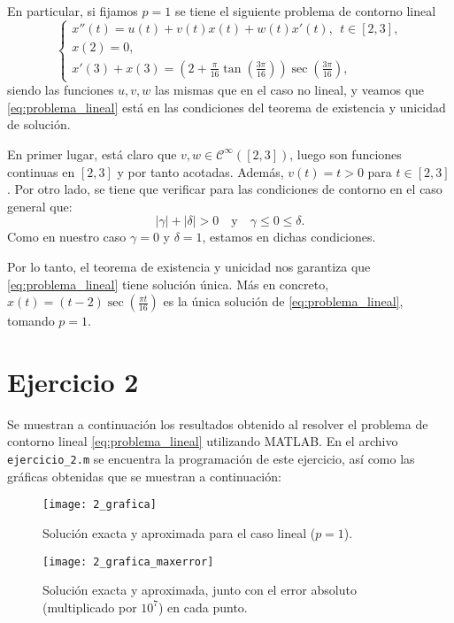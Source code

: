 \documentclass[11pt]{article}
\begin{document}
En particular, si fijamos $p=1$ se tiene el siguiente problema de contorno lineal
\begin{equation} \label{eq:problema_lineal}
\begin{cases}
x''(t)=u(t)+v(t)x(t)+w(t)x'(t), ~~ t\in[2,3],\\
x(2)=0,\\
x'(3)+x(3)=\left( 2+\frac{\pi}{16}\tan\left(\frac{3\pi}{16}\right) \right)\sec\left(\frac{3\pi}{16}\right),
\end{cases}
\end{equation}
siendo las funciones $u,v,w$ las mismas que en el caso no lineal, y veamos que \eqref{eq:problema_lineal} está en las condiciones del teorema de existencia y unicidad de solución.

En primer lugar, está claro que $v,w\in\mathcal{C}^{\infty}([2,3])$, luego son funciones continuas en $[2,3]$ y por tanto acotadas. Además, $v(t)=t>0$ para $t\in[2,3]$. Por otro lado, se tiene que verificar para las condiciones de contorno en el caso general que:
\[
|\gamma| +|\delta|>0 \quad \text{y} \quad \gamma \leq 0 \leq \delta.
\]
Como en nuestro caso $\gamma=0$ y $\delta=1$, estamos en dichas condiciones.

Por lo tanto, el teorema de existencia y unicidad nos garantiza que \eqref{eq:problema_lineal} tiene solución única. Más en concreto, $ x(t) = (t-2)\sec \left(\frac{\pi t}{16}\right)$ es la única solución de \eqref{eq:problema_lineal}, tomando $p=1$.

\section*{Ejercicio 2}

Se muestran a continuación los resultados obtenido al resolver el problema de contorno lineal \eqref{eq:problema_lineal} utilizando MATLAB. En el archivo \texttt{ejercicio\_2.m} se encuentra la programación de este ejercicio, así como las gráficas obtenidas que se muestran a continuación:

\begin{figure}[H]
\centering
\texttt{[image: 2\_grafica]}
\caption{Solución exacta y aproximada para el caso lineal ($p=1$).}
\label{fig:p1_sol}
\end{figure}
\begin{figure}[H]
\centering
\texttt{[image: 2\_grafica\_maxerror]}
\caption{Solución exacta y aproximada, junto con el error absoluto (multiplicado por $10^7$) en cada punto.}
\label{fig:p1_error}
\end{figure}
\end{document}
